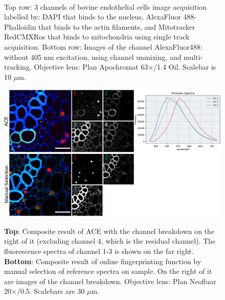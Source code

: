 \begin{figure}[h!]
\\
\caption{Top row: 3 channels of bovine endothelial cells image acquisition labelled by: DAPI that binds to the nucleus, AlexaFluor 488-Phalloidin that binds to the actin filaments, and Mitotracker RedCMXRos that binds to mitochondria using single track acquisition. 
Bottom row: Images of the channel AlexaFluor488: without 405 nm excitation, using channel unmixing, and multi-tracking. 
Objective lens: Plan Apochromat 63$\times$/1.4 Oil. 
Scalebar is 10 $\mu$m.} 
\label{fig:bovendo}
\end{figure}

\begin{figure}[h!]
\centering
\includegraphics[width=\columnwidth]{Exp_3_LSM/Figures/MS3/ACEolfp}\\
\caption{\textbf{Top}: Composite result of ACE with the channel breakdown on the right of it (excluding channel 4, which is the residual channel).
The fluorescence spectra of channel 1-3 is shown on the far right.  
\textbf{Bottom}: Composite result of online fingerprinting function by manual selection of reference spectra on sample. On the right of it are images of the channel breakdown. 
Objective lens: Plan Neofluar 20$\times$/0.5. 
Scalebars are 30 $\mu$m.}
\label{fig:aceolfp}
\end{figure}

